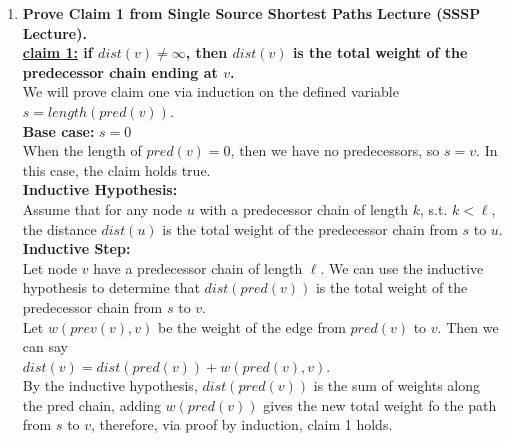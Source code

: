 \documentclass{article}
\begin{document}
\begin{enumerate}
\newpage
\item \textbf{ Prove Claim 1 from Single Source Shortest Paths Lecture (SSSP Lecture). } \\
\newline 
\textbf{ \underline{claim 1:} if $dist(v) \neq \infty$, then $dist(v)$ is the total weight of the predecessor chain ending at $v$. } \\

We will prove claim one via induction on the defined variable $s = length(pred(v))$. \\

\textbf{ Base case: } $s=0$ \\
When the length of $pred(v) = 0$, then we have no predecessors, so $s = v$. In this case, the claim holds true. \\ 

\textbf{ Inductive Hypothesis: } \\
Assume that for any node $u$ with a predecessor chain of length $k$, s.t. $k < \ell$, the distance $dist(u)$ is the total weight of the predecessor chain from $s$ to $u$. \\

\textbf{ Inductive Step: } \\
Let node $v$ have a predecessor chain of length $\ell$. We can use the inductive hypothesis to determine that $dist(pred(v))$ is the total weight of the predecessor chain from $s$ to $v$. \\
\newline 
Let $w(prev(v),v)$ be the weight of the edge from $pred(v)$ to $v$. Then we can say \\
$dist(v) = dist(pred(v)) + w(pred(v),v)$. \\
\newline 
By the inductive hypothesis, $dist(pred(v))$ is the sum of weights along the pred chain, adding $w(pred(v))$ gives the new total weight fo the path from $s$ to $v$, therefore, via proof by induction, claim 1 holds. \\
\newline










\end{enumerate}
\end{document}
